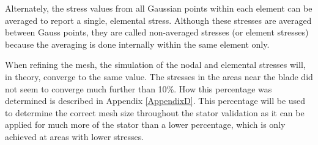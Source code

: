 Alternately, the stress values from all Gaussian points within each element can be averaged to report a single, elemental stress. Although these stresses are averaged between Gauss points, they are called non-averaged 
stresses (or element stresses) because the averaging is done internally within the same element only. 

When refining the mesh, the simulation of the nodal and elemental stresses will, in theory, converge to the same value. The stresses in the areas near the blade did not seem to converge much further than 10$\%$. How this percentage was determined is described in Appendix \ref{AppendixD}. This percentage will be used to determine the correct mesh size throughout the stator validation as it can be applied for much more of the stator than a lower percentage, which is only achieved at areas with lower stresses.
\newpage
